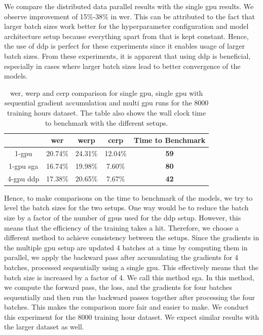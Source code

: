 We compare the distributed data parallel results with the single \acrshort{gpu} results. We observe improvement of 15\%-38\% in \acrshort{wer}. This can be attributed to the fact that larger batch sizes work better for the hyperparameter configuration and model architecture setup because everything apart from that is kept constant. Hence, the use of \acrshort{ddp} is perfect for these experiments since it enables usage of larger batch sizes. From these experiments, it is apparent that using \acrshort{ddp} is beneficial, especially in cases where larger batch sizes lead to better convergence of the models. 


\begin{table}[ht]
\centering
\begin{tabular}{c | c c c | c }
\hline
     & \acrshort{wer} & \acrshort{werp} & \acrshort{cerp} & Time to Benchmark\\
 \hline
  1-\acrshort{gpu} & 20.74\% & 24.31\% & 12.04\% & \textbf{59} \\
  1-\acrshort{gpu} \acrshort{sga} & 16.74\% & 19.98\% & 7.60\% & \textbf{80} \\
  4-\acrshort{gpu} \acrshort{ddp} & 17.38\% & 20.65\% & 7.67\% & \textbf{42} \\
 \hline
\end{tabular}
\caption{\label{table:wer_ddp_grad} \acrshort{wer}, \acrshort{werp} and \acrshort{cerp} comparison for single \acrshort{gpu}, single \acrshort{gpu} with sequential gradient accumulation and multi \acrshort{gpu} runs for the 8000 training hours dataset. The table also shows the wall clock time to benchmark with the different setups.}
\end{table}

Hence, to make comparisons on the time to benchmark of the models, we try to level the batch sizes for the two setups. One way would be to reduce the batch size by a factor of the number of \acrshort{gpu}s used for the \acrshort{ddp} setup. However, this means that the efficiency of the training takes a hit. Therefore, we choose a different method to achieve consistency between the setups. Since the gradients in the multiple \acrshort{gpu} setup are updated 4 batches at a time by computing them in parallel, we apply the backward pass after accumulating the gradients for 4 batches, processed sequentially using a single \acrshort{gpu}. This effectively means that the batch size is increased by a factor of 4. We call this method \acrfull{sga}. In this method, we compute the forward pass, the loss, and the gradients for four batches sequentially and then run the backward passes together after processing the four batches. This makes the comparison more fair and easier to make. We conduct this experiment for the 8000 training hour dataset. We expect similar results with the larger dataset as well. 

